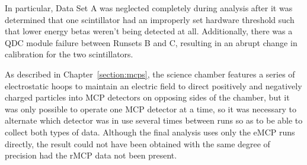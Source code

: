 In particular, Data Set A was neglected completely during analysis after it was determined that one scintillator had an improperly set hardware threshold such that lower energy betas weren't being detected at all.  Additionally, there was a QDC module failure between Runsets B and C, resulting in an abrupt change in calibration for the two scintillators.  
%





%

As described in Chapter~\ref{section:mcps}, the science chamber features a series of electrostatic hoops to maintain an electric field to direct positively and negatively charged particles into MCP detectors on opposing sides of the chamber, but it was only possible to operate one MCP detector at a time, so it was necessary to alternate which detector was in use several times between runs so as to be able to collect both types of data.  Although the final analysis uses only the eMCP runs directly, the result could not have been obtained with the same degree of precision had the rMCP data not been present.  


